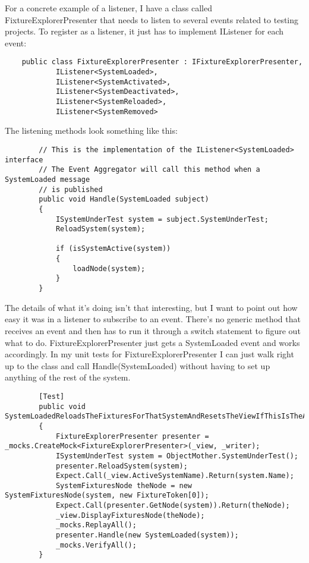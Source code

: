 \documentclass{article}
\begin{document}
{For a concrete example of a listener, I have a class called FixtureExplorerPresenter that needs to listen to several events related to testing projects. To register as a listener, it just has to implement IListener for each event:
\begin{lstlisting}
    public class FixtureExplorerPresenter : IFixtureExplorerPresenter,     
            IListener<SystemLoaded>,     
            IListener<SystemActivated>,
            IListener<SystemDeactivated>,
            IListener<SystemReloaded>,            
            IListener<SystemRemoved>
\end{lstlisting}
The listening methods look something like this:
\begin{lstlisting}
        // This is the implementation of the IListener<SystemLoaded> interface
        // The Event Aggregator will call this method when a SystemLoaded message
        // is published
        public void Handle(SystemLoaded subject)
        {
            ISystemUnderTest system = subject.SystemUnderTest;
            ReloadSystem(system);

            if (isSystemActive(system))
            {
                loadNode(system);
            }
        }
\end{lstlisting}		

The details of what it's doing isn't that interesting, but I want to point out how easy it was in a listener to subscribe to an event.  There's no generic method that receives an event and then has to run it through a switch statement to figure out what to do.  FixtureExplorerPresenter just gets a SystemLoaded event and works accordingly.  In my unit tests for FixtureExplorerPresenter I can just walk right up to the class and call Handle(SystemLoaded) without having to set up anything of the rest of the system.
\newpage
\begin{lstlisting}
        [Test]
        public void SystemLoadedReloadsTheFixturesForThatSystemAndResetsTheViewIfThisIsTheActiveSystem()
        {
            FixtureExplorerPresenter presenter = _mocks.CreateMock<FixtureExplorerPresenter>(_view, _writer);
            ISystemUnderTest system = ObjectMother.SystemUnderTest();
            presenter.ReloadSystem(system);
            Expect.Call(_view.ActiveSystemName).Return(system.Name);
            SystemFixturesNode theNode = new SystemFixturesNode(system, new FixtureToken[0]);
            Expect.Call(presenter.GetNode(system)).Return(theNode);
            _view.DisplayFixturesNode(theNode);
            _mocks.ReplayAll();
            presenter.Handle(new SystemLoaded(system));
            _mocks.VerifyAll();
        }
\end{lstlisting}

}
\end{document}
